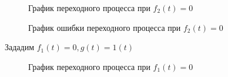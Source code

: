 \documentclass[a4paper, 11pt]{article}
\begin{document}
\begin{figure}[h!]
    \caption{График переходного процесса при $f_2(t) = 0$}
    \label{two}
\end{figure}
\newpage
\begin{figure}[h!]
    \caption{График ошибки переходного процесса при $f_2(t) = 0$}
    \label{tree}
\end{figure}



Зададим $f_1(t) = 0, g(t) = 1(t)$

\begin{figure}[h]
    \caption{График переходного процесса при $f_1(t) = 0$}
    \label{two}
\end{figure}
    
\end{document}
